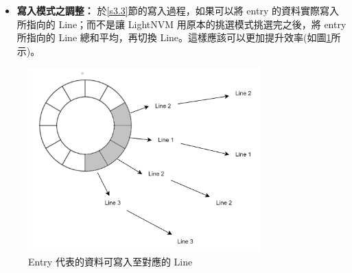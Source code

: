 \begin{itemize}
    \item\textbf{寫入模式之調整：}
    於\ref{s3.3}節的寫入過程，如果可以將 entry 的資料實際寫入所指向的 Line；而不是讓 LightNVM 用原本的挑選模式挑選完之後，將 entry 所指向的 Line 總和平均，再切換 Line。這樣應該可以更加提升效率(如圖\ref{f5.1}所示)。




\end{itemize}

\begin{figure}[H]
    \centering
    \includegraphics[width=0.8\textwidth]{picture/ch5/future.png}
    \caption{Entry 代表的資料可寫入至對應的 Line}
    \label{f5.1}
\end{figure}